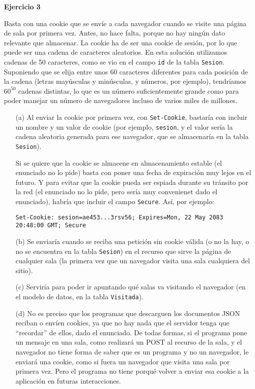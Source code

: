 \textbf{Ejercicio 3}

Basta con una cookie que se envíe a cada navegador cuando se visite una página de sala por primera vez. Antes, no hace falta, porque no hay ningún dato relevante que almacenar. La cookie ha de ser una cookie de sesión, por lo que puede ser una cadena de caracteres aleatorios. En esta solución utilizamos cadenas de 50 caracteres, como se vio en el campo \texttt{id} de la tabla \texttt{Sesion}. Suponiendo que se elija entre unos 60 caracteres diferentes para cada posición de la cadena (letras mayúsculas y minúsculas, y números, por ejemplo), tendríamos $60^{50}$ cadenas distintas, lo que es un número suficientemente grande como para poder manejar un número de navegadores incluso de varios miles de millones.

\begin{itemize}
\item[(a)] Al enviar la cookie por primera vez, con \texttt{Set-Cookie}, bastaría con incluir un nombre y un valor de cookie (por ejemplo, \texttt{sesion}, y el valor sería la cadena aleatoria generada para ese navegador, que se almacenaría en la tabla \texttt{Sesion}).

  Si se quiere que la cookie se almacene en almacenamiento estable (el enunciado no lo pide) basta con poner una fecha de expiración muy lejos en el futuro. Y para evitar que la cookie pueda ser espiada durante su tránsito por la red (el enunciado no lo pide, pero sería muy convenienet dado el enunciado), habría que incluir el campo \texttt{Secure}. Así, por ejemplo:

\begin{verbatim}
Set-Cookie: sesion=ae453...3rsv56; Expires=Mon, 22 May 2083 20:48:00 GMT; Secure
\end{verbatim}

\item[(b)] Se enviaría cuando se reciba una petición sin cookie válida (o no la hay, o no se encuentra en la tabla \texttt{Sesion}) en el recurso que sirve la página de cualquier sala (la primera vez que un navegador visita una sala cualquiera del sitio).

\item[(c)] Serviría para poder ir apuntando qué salas va visitando el navegador (en el modelo de datos, en la tabla \texttt{Visitada}).

\item[(d)] No es preciso que los programas que descarguen los documentos JSON reciban o envíen cookies, ya que no hay nada que el servidor tenga que ``recordar'' de ellos, dado el enunciado. De todas formas, si el programa pone un mensaje en una sala, como realizará un POST al recurso de la sala, y el navegador no tiene forma de saber que es un programa y no un navegador, le enviará una cookie, como si fuera un navegador que visita una sala por primera vez. Pero el programa no tiene porqué volver a enviar esa cookie a la aplicación en futuras interacciones.
\end{itemize}


